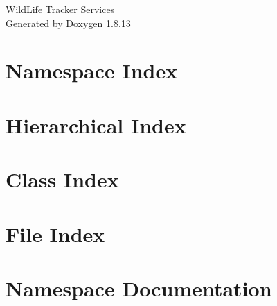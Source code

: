 \documentclass[twoside]{book}
\newcommand{\+}{\discretionary{\mbox{\scriptsize$\hookleftarrow$}}{}{}}
\newcommand{\clearemptydoublepage}{%
  \newpage{\pagestyle{empty}\cleardoublepage}%
}
\begin{document}
\hypersetup{pageanchor=false,
             bookmarksnumbered=true,
             pdfencoding=unicode
            }
\begin{titlepage}
\vspace*{7cm}
\begin{center}%
{\Large Wild\+Life Tracker Services }\\
\vspace*{1cm}
{\large Generated by Doxygen 1.8.13}\\
\end{center}
\end{titlepage}
\clearemptydoublepage
{}
\tableofcontents
\clearemptydoublepage
{}
\hypersetup{pageanchor=true}

\chapter{Namespace Index}

\chapter{Hierarchical Index}

\chapter{Class Index}

\chapter{File Index}

\chapter{Namespace Documentation}






\end{document}
